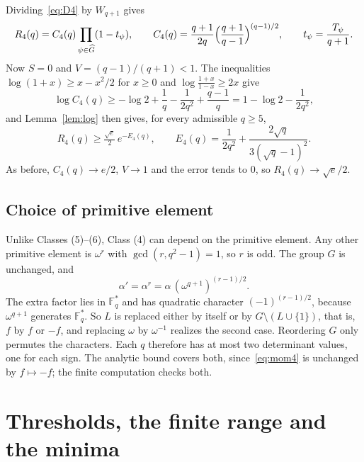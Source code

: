 \documentclass[11pt]{article}
\newcommand{\F}{\mathbb F}
\newcommand{\Lstar}{\tfrac{\sqrt e}{2}}
\begin{document}
Dividing~\eqref{eq:D4} by $W_{q+1}$ gives
\begin{equation}\label{eq:P4}
 R_4(q)=C_4(q)\prod_{\psi\in\widehat G}(1-t_\psi),\qquad
 C_4(q)=\frac{q+1}{2q}\Bigl(\frac{q+1}{q-1}\Bigr)^{(q-1)/2},\qquad
 t_\psi=\frac{T_\psi}{q+1}.
\end{equation}
Now $S=0$ and $V=(q-1)/(q+1)<1$. The inequalities
$\log(1+x)\ge x-x^2/2$ for $x\ge0$ and $\log\frac{1+x}{1-x}\ge2x$ give
\[
 \log C_4(q)\ge-\log2+\frac1q-\frac1{2q^2}+\frac{q-1}{q}=1-\log2-\frac1{2q^2},
\]
and Lemma~\ref{lem:log} then gives, for every admissible $q\ge5$,
\begin{equation}\label{eq:E4}
 R_4(q)\ge\Lstar\,e^{-E_4(q)},\qquad
 E_4(q)=\frac1{2q^2}+\frac{2\sqrt q}{3(\sqrt q-1)^2}.
\end{equation}
As before, $C_4(q)\to e/2$, $V\to1$ and the error tends to $0$, so
$R_4(q)\to\sqrt e/2$.

\subsection{Choice of primitive element}\label{sec:choices}
Unlike Classes (5)--(6), Class (4) can depend on the primitive element.
Any other primitive element is $\omega^r$ with $\gcd(r,q^2-1)=1$, so $r$ is
odd. The group $G$ is unchanged, and
\[
 \alpha'=\alpha^r=\alpha\,(\omega^{q+1})^{(r-1)/2}.
\]
The extra factor lies in $\F_q^*$ and has quadratic character
$(-1)^{(r-1)/2}$, because $\omega^{q+1}$ generates $\F_q^*$. So $L$ is
replaced either by itself or by $G\setminus(L\cup\{1\})$, that is, $f$ by
$f$ or $-f$, and replacing $\omega$ by $\omega^{-1}$ realizes the second
case. Reordering $G$ only permutes the characters. Each $q$ therefore has
at most two determinant values, one for each sign. The analytic bound
covers both, since~\eqref{eq:mom4} is unchanged by $f\mapsto-f$; the finite
computation checks both.

\section{Thresholds, the finite range and the minima}\label{sec:finite}
\end{document}
